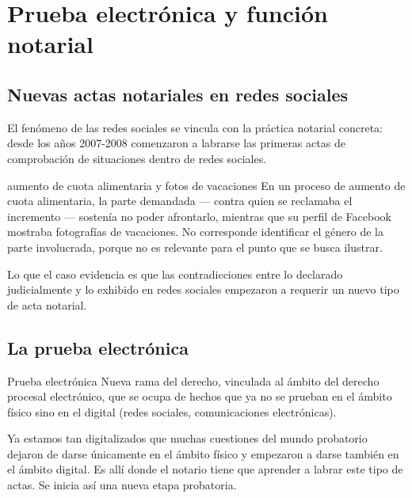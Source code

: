 \documentclass[12pt,oneside]{book}
\begin{document}
\chapter[Prueba electrónica]{Prueba electrónica y función notarial}
\label{cap:prueba}

\section{Nuevas actas notariales en redes sociales}

El fenómeno de las redes sociales se vincula con la práctica notarial concreta: desde los años 2007-2008 comenzaron a labrarse las primeras actas de comprobación de situaciones dentro de redes sociales.

\begin{example}{aumento de cuota alimentaria y fotos de vacaciones}
En un proceso de aumento de cuota alimentaria, la parte demandada --- contra quien se reclamaba el incremento --- sostenía no poder afrontarlo, mientras que su perfil de Facebook mostraba fotografías de vacaciones. No corresponde identificar el género de la parte involucrada, porque no es relevante para el punto que se busca ilustrar.

Lo que el caso evidencia es que las contradicciones entre lo declarado judicialmente y lo exhibido en redes sociales empezaron a requerir un nuevo tipo de acta notarial.
\end{example}

\section{La prueba electrónica}

\begin{definition}{Prueba electrónica}
Nueva rama del derecho, vinculada al ámbito del derecho procesal electrónico, que se ocupa de hechos que ya no se prueban en el ámbito físico sino en el digital (redes sociales, comunicaciones electrónicas).
\end{definition}

Ya estamos tan digitalizados que muchas cuestiones del mundo probatorio dejaron de darse únicamente en el ámbito físico y empezaron a darse también en el ámbito digital. Es allí donde el notario tiene que aprender a labrar este tipo de actas. Se inicia así una nueva etapa probatoria.
\end{document}
